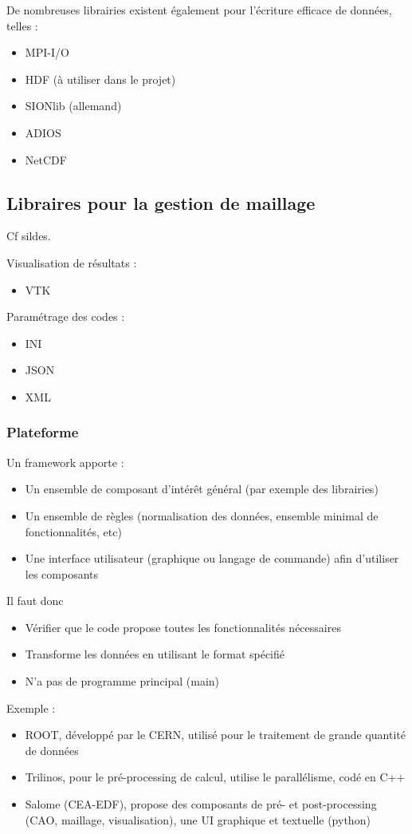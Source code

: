 \documentclass{article}
\begin{document}
De nombreuses librairies existent également pour l'écriture efficace de données, telles :
\begin{itemize}
\item MPI-I/O
\item HDF (à utiliser dans le projet)
\item SIONlib (allemand)
\item ADIOS
\item NetCDF
\end{itemize}

\subsection{Libraires pour la gestion de maillage}
Cf sildes.


Visualisation de résultats :
\begin{itemize}
\item VTK
\end{itemize}
\bigskip

Paramétrage des codes :
\begin{itemize}
\item INI
\item JSON
\item XML
\end{itemize}


\subsubsection{Plateforme}
Un framework apporte :
\begin{itemize}
\item Un ensemble de composant d'intérêt général (par exemple des librairies)
\item Un ensemble de règles (normalisation des données, ensemble minimal de fonctionnalités, etc)
\item Une interface utilisateur (graphique ou langage de commande) afin d'utiliser les composants
\end{itemize}
\bigskip

Il faut donc
\begin{itemize}
\item Vérifier que le code propose toutes les fonctionnalités nécessaires
\item Transforme les données en utilisant le format spécifié
\item N'a pas de programme principal (main)
\end{itemize}
\bigskip

Exemple : 
\begin{itemize}
\item ROOT, développé par le CERN, utilisé pour le traitement de grande quantité de données
\item Trilinos, pour le pré-processing de calcul, utilise le parallélisme, codé en C++
\item Salome (CEA-EDF), propose des composants de pré- et post-processing (CAO, maillage, visualisation), une UI graphique et textuelle (python) 
\end{itemize}
\end{document}
